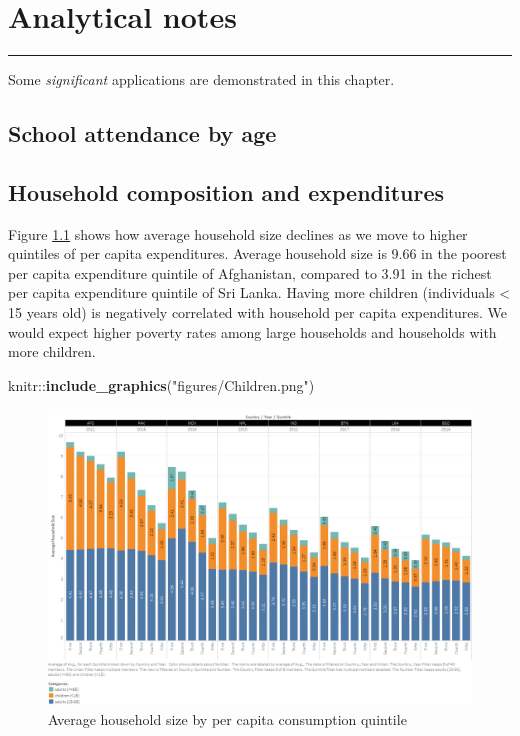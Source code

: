 \documentclass[13 pt,]{book}
\newenvironment{Shaded}{\begin{snugshade}}{\end{snugshade}}
\newcommand{\KeywordTok}[1]{\textcolor[rgb]{0.13,0.29,0.53}{\textbf{{#1}}}}
\newcommand{\StringTok}[1]{\textcolor[rgb]{0.31,0.60,0.02}{{#1}}}
\newcommand{\NormalTok}[1]{{#1}}
\begin{document}
\chapter{Analytical notes}\label{application}

\begin{center}\rule{0.5\linewidth}{\linethickness}\end{center}

Some \emph{significant} applications are demonstrated in this chapter.

\section{School attendance by age}\label{school-attendance-by-age}

\section{Household composition and
expenditures}\label{household-composition-and-expenditures}

Figure \ref{fig:children} shows how average household size declines as
we move to higher quintiles of per capita expenditures. Average
household size is 9.66 in the poorest per capita expenditure quintile of
Afghanistan, compared to 3.91 in the richest per capita expenditure
quintile of Sri Lanka. Having more children (individuals \textless{} 15
years old) is negatively correlated with household per capita
expenditures. We would expect higher poverty rates among large
households and households with more children.

\begin{Shaded}
\begin{Highlighting}[]
\NormalTok{knitr::}\KeywordTok{include_graphics}\NormalTok{(}\StringTok{"figures/Children.png"}\NormalTok{)}
\end{Highlighting}
\end{Shaded}

\begin{figure}

{\centering \includegraphics[width=0.8\linewidth]{figures/Children} 

}

\caption{Average household size by per capita consumption quintile}\label{fig:children}
\end{figure}
\end{document}
